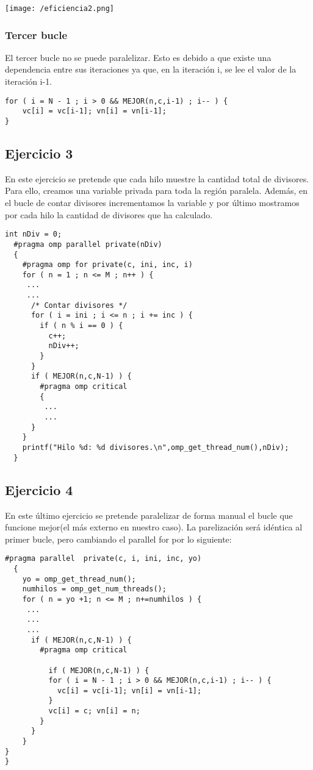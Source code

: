 \documentclass[11pt,oneside,a4paper]{article}
\begin{document}
\texttt{[image: /eficiencia2.png]}
\subsubsection{Tercer bucle}

El tercer bucle no se puede paralelizar. Esto es debido a que existe una dependencia entre sus iteraciones ya que, en la iteración i, se lee el valor de la iteración i-1. 
\lstset{language=C, breaklines=true, basicstyle=\footnotesize}
\begin{lstlisting}[frame=single]
for ( i = N - 1 ; i > 0 && MEJOR(n,c,i-1) ; i-- ) {
	vc[i] = vc[i-1]; vn[i] = vn[i-1];
}
\end{lstlisting}
\subsection{Ejercicio 3}
En este ejercicio se pretende  que cada hilo muestre la cantidad total de divisores. Para ello, creamos una variable privada para toda la región paralela. Además, en el bucle de contar divisores incrementamos la variable y por último mostramos por cada hilo la cantidad de divisores que ha calculado.


\lstset{language=C, breaklines=true, basicstyle=\footnotesize}
\begin{lstlisting}[frame=single , showstringspaces=false]
int nDiv = 0;
  #pragma omp parallel private(nDiv)
  {
    #pragma omp for private(c, ini, inc, i)
    for ( n = 1 ; n <= M ; n++ ) {
     ...
     ...
      /* Contar divisores */
      for ( i = ini ; i <= n ; i += inc ) {
        if ( n % i == 0 ) {
          c++;
          nDiv++;
        }
      }
      if ( MEJOR(n,c,N-1) ) {
        #pragma omp critical
        {
         ...
         ...
      }
    }
    printf("Hilo %d: %d divisores.\n",omp_get_thread_num(),nDiv);
  }
\end{lstlisting}

\subsection{Ejercicio 4}
En este último ejercicio se pretende paralelizar de forma manual el bucle que funcione mejor(el más externo en nuestro caso).
La parelización será idéntica al primer bucle, pero cambiando el parallel for por lo siguiente:
\lstset{language=C, breaklines=true, basicstyle=\footnotesize}
\begin{lstlisting}[frame=single, showstringspaces=false]
#pragma parallel  private(c, i, ini, inc, yo)
  {
    yo = omp_get_thread_num();
    numhilos = omp_get_num_threads();
    for ( n = yo +1; n <= M ; n+=numhilos ) {
     ...
     ...
     ...
      if ( MEJOR(n,c,N-1) ) {
        #pragma omp critical
       
          if ( MEJOR(n,c,N-1) ) {
          for ( i = N - 1 ; i > 0 && MEJOR(n,c,i-1) ; i-- ) {
            vc[i] = vc[i-1]; vn[i] = vn[i-1];
          }
          vc[i] = c; vn[i] = n;
        }
      }
    }
}
}
\end{lstlisting}
 
\end{document}
